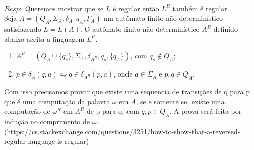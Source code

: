 \documentclass{homework}
\begin{document}
\pagestyle{fancy}

\\

	$Resp:$ Queremos mostrar que se $L$ é regular então $L^R$ também é regular.\\
	Seja $A = (Q_A,\Sigma_A,\delta_A,q_A,F_A)$ um autômato finito não determinístico satisfazendo $L = L(A)$. O autômato finito não determinístico $A^R$ definido abaixo aceita a linguagem $L^R$.
	\begin{enumerate}
		\item $A^R = (Q_A \cup \{q_s\},\Sigma_A,\delta_{A^R},q_s,\{q_A\})$, com $q_s \notin Q_A$;
		\item $p \in \delta_A(q,a) \iff q \in \delta_{A^R}(p,a)$, onde $a \in \Sigma_A$ e $p,q \in Q_A$.
	\end{enumerate}
	Com isso precisamos provar que existe uma sequencia de transições de q para p que é uma computação da palavra $\omega$ em $A$, se e somente se, existe uma computação de $\omega^R$ em $A^R$ de p para q, com $q,p \in Q_A$. A prova será feita por indução no comprimento de $\omega$.
(https://cs.stackexchange.com/questions/3251/how-to-show-that-a-reversed-regular-language-is-regular)
\end{document}
